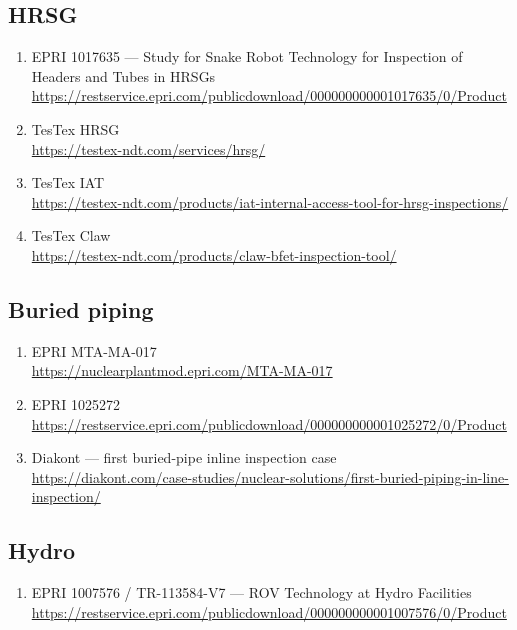 \documentclass[11pt,a4paper]{article}
\begin{document}
\subsection*{HRSG}
\begin{enumerate}[start=9]
\item EPRI 1017635 — Study for Snake Robot Technology for Inspection of Headers and Tubes in HRSGs \\
\url{https://restservice.epri.com/publicdownload/000000000001017635/0/Product}
\item TesTex HRSG \\
\url{https://testex-ndt.com/services/hrsg/}
\item TesTex IAT \\
\url{https://testex-ndt.com/products/iat-internal-access-tool-for-hrsg-inspections/}
\item TesTex Claw \\
\url{https://testex-ndt.com/products/claw-bfet-inspection-tool/}
\end{enumerate}


\subsection*{Buried piping}
\begin{enumerate}[start=13]
\item EPRI MTA-MA-017 \\
\url{https://nuclearplantmod.epri.com/MTA-MA-017}
\item EPRI 1025272 \\
\url{https://restservice.epri.com/publicdownload/000000000001025272/0/Product}
\item Diakont — first buried-pipe inline inspection case \\
\url{https://diakont.com/case-studies/nuclear-solutions/first-buried-piping-in-line-inspection/}
\end{enumerate}


\subsection*{Hydro}
\begin{enumerate}[start=16]
\item EPRI 1007576 / TR-113584-V7 — ROV Technology at Hydro Facilities \\
\url{https://restservice.epri.com/publicdownload/000000000001007576/0/Product}
\end{enumerate}
\end{document}
